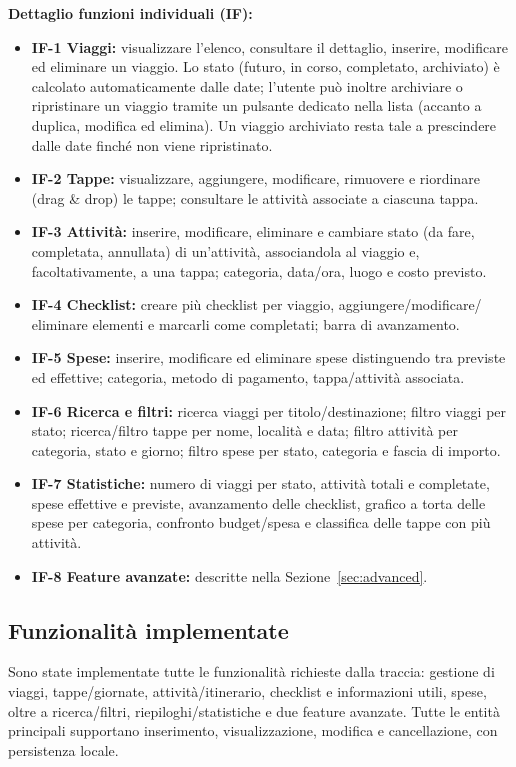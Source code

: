 \documentclass[11pt, a4paper]{article}
\begin{document}
\noindent \textbf{Dettaglio funzioni individuali (IF):}
\begin{itemize}[nosep]
    \item \textbf{IF-1 Viaggi:} visualizzare l'elenco, consultare il dettaglio, inserire,
    modificare ed eliminare un viaggio. Lo stato (futuro, in corso, completato,
    archiviato) è calcolato automaticamente dalle date; l'utente può inoltre archiviare o
    ripristinare un viaggio tramite un pulsante dedicato nella lista (accanto a duplica,
    modifica ed elimina). Un viaggio archiviato resta tale a prescindere dalle date finché
    non viene ripristinato.
    \item \textbf{IF-2 Tappe:} visualizzare, aggiungere, modificare, rimuovere e riordinare
    (drag \& drop) le tappe; consultare le attività associate a ciascuna tappa.
    \item \textbf{IF-3 Attività:} inserire, modificare, eliminare e cambiare stato (da fare,
    completata, annullata) di un'attività, associandola al viaggio e, facoltativamente, a
    una tappa; categoria, data/ora, luogo e costo previsto.
    \item \textbf{IF-4 Checklist:} creare più checklist per viaggio, aggiungere/modificare/
    eliminare elementi e marcarli come completati; barra di avanzamento.
    \item \textbf{IF-5 Spese:} inserire, modificare ed eliminare spese distinguendo tra
    previste ed effettive; categoria, metodo di pagamento, tappa/attività associata.
    \item \textbf{IF-6 Ricerca e filtri:} ricerca viaggi per titolo/destinazione; filtro
    viaggi per stato; ricerca/filtro tappe per nome, località e data; filtro attività per
    categoria, stato e giorno; filtro spese per stato, categoria e fascia di importo.
    \item \textbf{IF-7 Statistiche:} numero di viaggi per stato, attività totali e
    completate, spese effettive e previste, avanzamento delle checklist, grafico a torta
    delle spese per categoria, confronto budget/spesa e classifica delle tappe con più
    attività.
    \item \textbf{IF-8 Feature avanzate:} descritte nella Sezione~\ref{sec:advanced}.
\end{itemize}

\subsection{Funzionalità implementate}
Sono state implementate tutte le funzionalità richieste dalla traccia: gestione di
viaggi, tappe/giornate, attività/itinerario, checklist e informazioni utili, spese,
oltre a ricerca/filtri, riepiloghi/statistiche e due feature avanzate. Tutte le entità
principali supportano inserimento, visualizzazione, modifica e cancellazione, con
persistenza locale.
\end{document}
